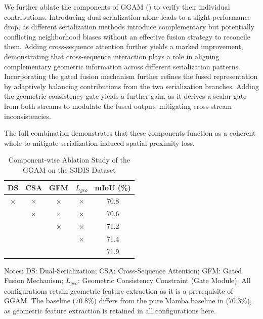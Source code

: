 \documentclass[a4paper,fleqn]{cas-sc}
\begin{document}
We further ablate the components of GGAM () to verify their individual contributions.
Introducing dual-serialization alone leads to a slight performance drop, as different serialization methods introduce complementary but potentially conflicting neighborhood biases without an effective fusion strategy to reconcile them. Adding cross-sequence attention further yields a marked improvement, demonstrating that cross-sequence interaction plays a role in aligning complementary geometric information across different serialization patterns. Incorporating the gated fusion mechanism further refines the fused representation by adaptively balancing contributions from the two serialization branches. Adding the geometric consistency gate yields a further gain, as it derives a scalar gate from both streams to modulate the fused output, mitigating cross-stream inconsistencies.

The full combination demonstrates that these components function as a coherent whole to mitigate serialization-induced spatial proximity loss.

\begin{table}[!t]
	\centering
	\caption{Component-wise Ablation Study of the GGAM on the S3DIS Dataset}
	\label{tab:ggam_components}
	\begin{tabular}{ccccc}
		\toprule
		\textbf{DS} & \textbf{CSA} & \textbf{GFM} & \textbf{$L_{geo}$} & \textbf{mIoU (\%)} \\
		\midrule
		$\times$ & $\times$ & $\times$ & $\times$ & 70.8 \\
		\checkmark & $\times$ & $\times$ & $\times$ & 70.6 \\
		\checkmark & \checkmark & $\times$ & $\times$ & 71.2 \\
		\checkmark & \checkmark & \checkmark & $\times$ & 71.4 \\
		\checkmark & \checkmark & \checkmark & \checkmark & 71.9 \\
		\bottomrule
	\end{tabular}
	\par\vspace{3pt}
	\footnotesize Notes: DS: Dual-Serialization; CSA: Cross-Sequence Attention; GFM: Gated Fusion Mechanism; $L_{geo}$: Geometric Consistency Constraint (Gate Module). All configurations retain geometric feature extraction as it is a prerequisite of GGAM. The baseline (70.8\%) differs from the pure Mamba baseline in  (70.3\%), as geometric feature extraction is retained in all configurations here.
\end{table}
\end{document}
